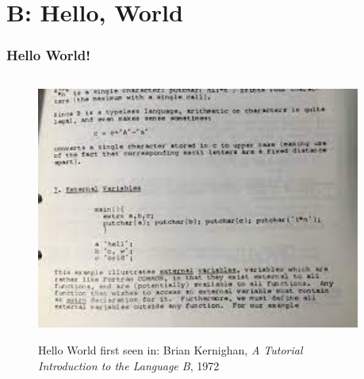 \section{B: Hello, World}

\begin{frame}[fragile]
\frametitle{Hello World!}

\begin{columns}
\begin{column}{0.5\textwidth}
\begin{figure}[h]
\centerline{
\includegraphics[width=1.0\textwidth]{../Figs/hello-in-b.jpg}
}
\centerline{
{\tiny Hello World first seen in: Brian Kernighan, {\it A Tutorial Introduction to the Language B}, 1972}
}
\end{figure}
\end{column}

\begin{column}{0.5\textwidth}

\end{column}

\end{columns}
\end{frame}



